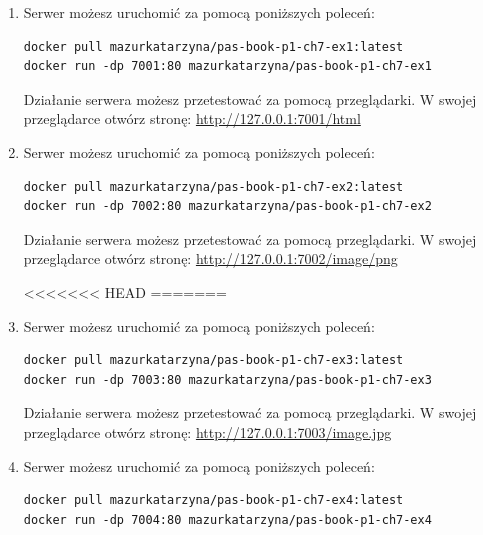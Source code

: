 \begin{enumerate}[label=\textbf{7.\arabic*}]\setlength{\itemsep}{1em}
\item Serwer możesz uruchomić za pomocą poniższych poleceń:

\begin{verbatim}
docker pull mazurkatarzyna/pas-book-p1-ch7-ex1:latest
docker run -dp 7001:80 mazurkatarzyna/pas-book-p1-ch7-ex1
\end{verbatim}

\noindent Działanie serwera możesz przetestować za pomocą przeglądarki. W swojej przeglądarce otwórz stronę: \url{http://127.0.0.1:7001/html}

\item Serwer możesz uruchomić za pomocą poniższych poleceń:

\begin{verbatim}
docker pull mazurkatarzyna/pas-book-p1-ch7-ex2:latest
docker run -dp 7002:80 mazurkatarzyna/pas-book-p1-ch7-ex2
\end{verbatim}

\noindent Działanie serwera możesz przetestować za pomocą przeglądarki. W swojej przeglądarce otwórz stronę: \url{http://127.0.0.1:7002/image/png}

<<<<<<< HEAD
=======
\item Serwer możesz uruchomić za pomocą poniższych poleceń:

\begin{verbatim}
docker pull mazurkatarzyna/pas-book-p1-ch7-ex3:latest
docker run -dp 7003:80 mazurkatarzyna/pas-book-p1-ch7-ex3
\end{verbatim}

\noindent Działanie serwera możesz przetestować za pomocą przeglądarki. W swojej przeglądarce otwórz stronę: \url{http://127.0.0.1:7003/image.jpg}

\item Serwer możesz uruchomić za pomocą poniższych poleceń:

\begin{verbatim}
docker pull mazurkatarzyna/pas-book-p1-ch7-ex4:latest
docker run -dp 7004:80 mazurkatarzyna/pas-book-p1-ch7-ex4
\end{verbatim}


\end{enumerate}
